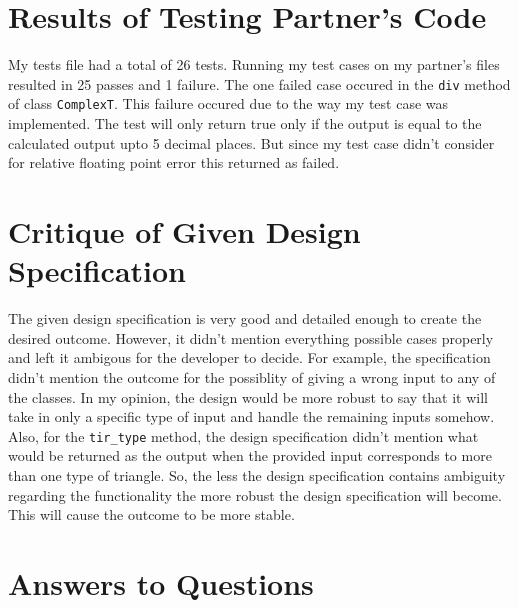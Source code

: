 \documentclass[12pt]{article}
\begin{document}
\section{Results of Testing Partner's Code}
My tests file had a total of 26 tests. Running my test cases on my partner's files resulted in 25 passes and 1 failure. The one failed case occured in the \verb|div| method of class \verb|ComplexT|. This failure occured due to the way my test case was implemented. The test will only return true only if the output is equal to the calculated output upto 5 decimal places. But since my test case didn't consider for relative floating point error this returned as failed.


\section{Critique of Given Design Specification}
The given design specification is very good and detailed enough to create the desired outcome. 
However, it didn't mention everything possible cases properly and left it ambigous for the developer to decide. For example, the specification didn't mention the outcome for the possiblity of giving a wrong input to any of the classes. In my opinion, the design would be more robust to say that it will take in only a specific type of input and handle the remaining inputs somehow. Also, for the \verb|tir_type| method, the design specification didn't mention what would be 
returned as the output when the provided input corresponds to more than one type of triangle. So, 
the less the design specification contains ambiguity regarding the functionality the more robust
the design specification will become. This will cause the outcome to be more stable.


\section{Answers to Questions}
\end{document}
